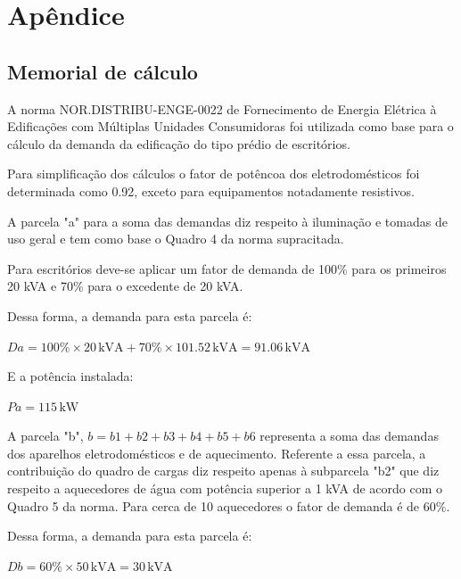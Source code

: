 \section{Apêndice}

\subsection{Memorial de cálculo}

A norma NOR.DISTRIBU-ENGE-0022 de Fornecimento de Energia Elétrica à Edificações com Múltiplas Unidades Consumidoras foi utilizada como base para o cálculo da demanda da edificação do tipo prédio de escritórios.

Para simplificação dos cálculos o fator de potêncoa dos eletrodomésticos foi determinada como 0.92, exceto para equipamentos notadamente resistivos.

A parcela "a" para a soma das demandas diz respeito à iluminação e tomadas de uso geral e tem como base o Quadro 4 da norma supracitada.
    
Para escritórios deve-se aplicar um fator de demanda de 100\% para os primeiros 20 kVA e 70\% para o excedente de 20 kVA.
    
    

    
Dessa forma, a demanda para esta parcela é:

\begin{center}
    $Da = 100\% \times 20 \, \text{kVA} + 70\% \times 101.52 \, \text{kVA} = 91.06 \, \text{kVA}$
\end{center}

E a potência instalada:

\begin{center}
    $Pa = 115 \, \text{kW}$
\end{center}

A parcela "b", $b=b1+b2+b3+b4+b5+b6$ representa a soma das demandas dos aparelhos eletrodomésticos e de aquecimento. Referente a essa parcela, a contribuição do quadro de cargas diz respeito apenas à subparcela "b2" que diz respeito a aquecedores de água com potência superior a 1 kVA de acordo com o Quadro 5 da norma. Para cerca de 10 aquecedores o fator de demanda é de 60\%.



Dessa forma, a demanda para esta parcela é:

\begin{center}
    $Db = 60\% \times 50 \, \text{kVA} = 30 \, \text{kVA}$
\end{center}

